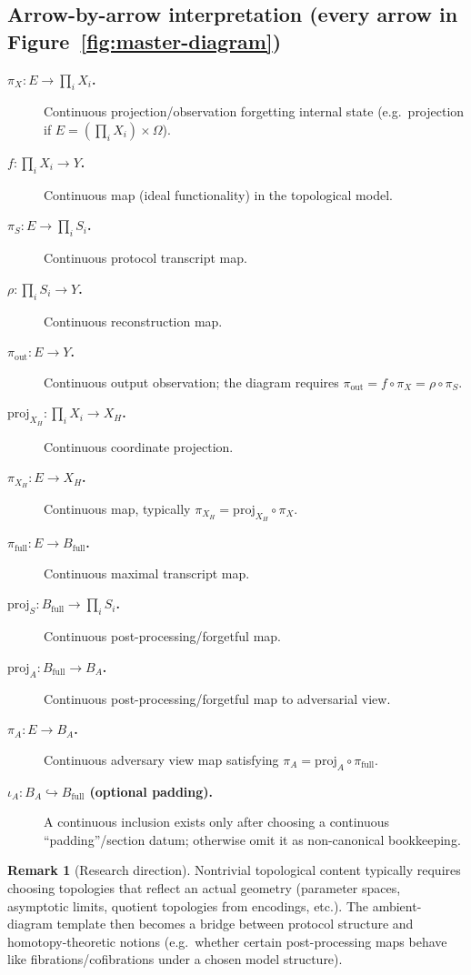 \documentclass[11pt,a4paper]{article}
\theoremstyle{definition}
\newtheorem{remark}[definition]{Remark}
\theoremstyle{plain}
\begin{document}
\subsection{Arrow-by-arrow interpretation (every arrow in Figure~\ref{fig:master-diagram})}
\begin{description}
    \item[\textbf{$\pi_X:E\to \prod_i X_i$.}] Continuous projection/observation forgetting internal state (e.g.\ projection if $E=(\prod_i X_i)\times\Omega$).
    \item[\textbf{$f:\prod_i X_i\to Y$.}] Continuous map (ideal functionality) in the topological model.
    \item[\textbf{$\pi_S:E\to \prod_i S_i$.}] Continuous protocol transcript map.
    \item[\textbf{$\rho:\prod_i S_i\to Y$.}] Continuous reconstruction map.
    \item[\textbf{$\pi_{\mathrm{out}}:E\to Y$.}] Continuous output observation; the diagram requires $\pi_{\mathrm{out}}=f\circ \pi_X=\rho\circ \pi_S$.
    \item[\textbf{$\mathrm{proj}_{X_H}:\prod_i X_i\to X_H$.}] Continuous coordinate projection.
    \item[\textbf{$\pi_{X_H}:E\to X_H$.}] Continuous map, typically $\pi_{X_H}=\mathrm{proj}_{X_H}\circ \pi_X$.
    \item[\textbf{$\pi_{\mathrm{full}}:E\to B_{\mathrm{full}}$.}] Continuous maximal transcript map.
    \item[\textbf{$\mathrm{proj}_S:B_{\mathrm{full}}\to \prod_i S_i$.}] Continuous post-processing/forgetful map.
    \item[\textbf{$\mathrm{proj}_A:B_{\mathrm{full}}\to B_A$.}] Continuous post-processing/forgetful map to adversarial view.
    \item[\textbf{$\pi_A:E\to B_A$.}] Continuous adversary view map satisfying $\pi_A=\mathrm{proj}_A\circ \pi_{\mathrm{full}}$.
    \item[\textbf{$\iota_A:B_A\hookrightarrow B_{\mathrm{full}}$ (optional padding).}] A continuous inclusion exists only after choosing a continuous ``padding''/section datum; otherwise omit it as non-canonical bookkeeping.
\end{description}

\begin{remark}[Research direction]
Nontrivial topological content typically requires choosing topologies that reflect an actual geometry (parameter spaces, asymptotic limits, quotient topologies from encodings, etc.). The ambient-diagram template then becomes a bridge between protocol structure and homotopy-theoretic notions (e.g.\ whether certain post-processing maps behave like fibrations/cofibrations under a chosen model structure).
\end{remark}
\end{document}
